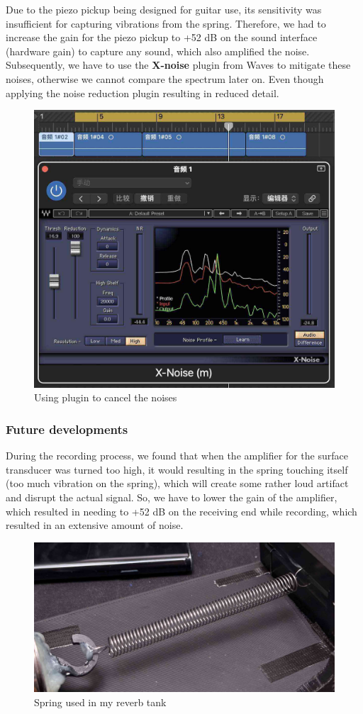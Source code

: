 \documentclass[12pt]{article}
\begin{document}
Due to the piezo pickup being designed for guitar use, its sensitivity was insufficient for capturing vibrations from the spring. Therefore, we had to increase the gain for the piezo pickup to +52 dB on the sound interface (hardware gain) to capture any sound, which also amplified the noise. Subsequently, we have to use the \textbf{X-noise} plugin from Waves to mitigate these noises, otherwise we cannot compare the spectrum later on. Even though applying the noise reduction plugin resulting in reduced detail.

\begin{figure}[h]
\center
	\includegraphics[width=0.5\linewidth]{photos/xnoise.jpg}
	\caption{Using plugin to cancel the noises}
\end{figure}

\subsubsection{Future developments}

During the recording process, we found that when the amplifier for the surface transducer was turned too high, it would resulting in the spring touching itself (too much vibration on the spring), which will create some rather loud artifact and disrupt the actual signal. So, we have to lower the gain of the amplifier, which resulted in needing to +52 dB on the receiving end while recording, which resulted in an extensive amount of noise.

\begin{figure}[h] 
	\center 
	\includegraphics[width=0.5\linewidth]{photos/spring.jpg} 
	\caption{Spring used in my reverb tank} 
\end{figure} 
\end{document}

